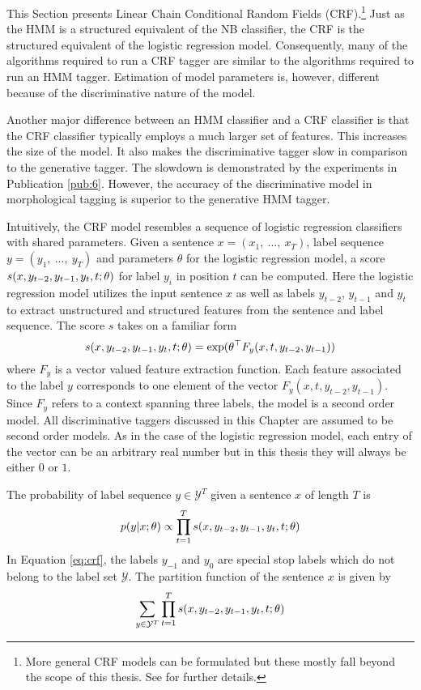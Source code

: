 This Section presents Linear Chain Conditional Random Fields
(CRF).\footnote{More general CRF models can be formulated but these
  mostly fall beyond the scope of this thesis. See \citep{Sutton2012}
  for further details.} Just as the HMM is a structured equivalent of
the NB classifier, the CRF is the structured equivalent of the
logistic regression model. Consequently, many of the algorithms required to run a CRF
tagger are similar to the algorithms required to run an HMM
tagger. Estimation of model parameters is, however, different because
of the discriminative nature of the model.

Another major difference between an HMM classifier and a CRF
classifier is that the CRF classifier typically employs a much larger
set of features. This increases the size of the model. It also makes
the discriminative tagger slow in comparison to the generative
tagger. The slowdown is demonstrated by the experiments in
Publication \ref{pub:6}. However, the accuracy of the discriminative
model in morphological tagging is superior to the generative HMM tagger.

Intuitively, the CRF model resembles a sequence of logistic regression classifiers
with shared parameters. Given a sentence $x = (x_1,\ ...,\ x_T)$,
label sequence $y = (y_1,\ ...,\ y_T)$ and parameters $\theta$ for the
logistic regression model, a score $s(x, y_{t-2}, y_{t-1}, y_t, t\mbox{$ ; \, $} \theta)$ for label $y_i$ in position $t$ 
 can be computed. Here the logistic regression model
utilizes the input sentence $x$ as well as labels $y_{t - 2}$, $y_{t-1}$ and
$y_t$ to extract unstructured and structured features from the
sentence and label sequence. The score $s$ takes on a familiar form
$$s(x, y_{t-2}, y_{t-1}, y_t, t\mbox{$ ; \, $} \theta) = \exp(\theta^\top F_y(x, t, y_{t-2}, y_{t-1}))$$
where $F_y$ is a vector valued feature extraction function. Each
feature associated to the label $y$ corresponds to one element of the
vector $F_y(x, t, y_{t-2}, y_{t-1})$. Since $F_y$ refers to a context
spanning three labels, the model is a second order model. All
discriminative taggers discussed in this Chapter are assumed to be
second order models. As in the case of the logistic regression model,
each entry of the vector can be an arbitrary real number but in this
thesis they will always be either $0$ or $1$.

The probability of label sequence $y \in \mathcal{Y}^T$ given a sentence $x$ of length $T$ is
\begin{equation}\label{eq:crf}p(y|x\mbox{$ ; \, $}\theta) \propto \prod_{t = 1}^T s(x, y_{t-2}, y_{t-1}, y_t, t\mbox{$ ; \, $} \theta)\end{equation}
In Equation \ref{eq:crf}, the labels $y_{-1}$ and $y_0$ are special
stop labels which do not belong to the label set $\mathcal{Y}$. The partition function of the sentence $x$ is given by
\begin{equation}\sum_{y\in \mathcal{Y}^T}\prod_{t = 1}^T s(x, y_{t-2}, y_{t-1}, y_t, t\mbox{$ ; \, $} \theta)\end{equation}

